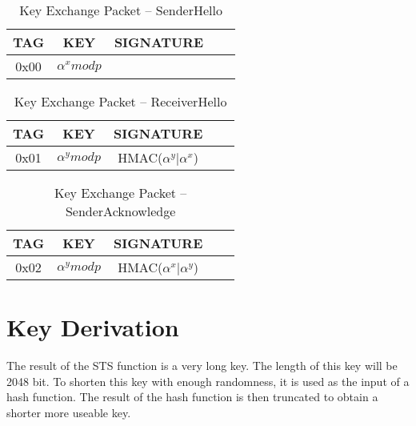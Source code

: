 \documentclass[a4paper]{article}
\begin{document}
\begin{table}[H]
    \begin{center}
        \begin{tabular}{| c | c | c | c | c |}
            \hline
            TAG & KEY & SIGNATURE \\ \hline
            0x00 & $\alpha^x mod p$ & \\
            \hline
        \end{tabular}
    \end{center}
    
    \caption{Key Exchange Packet -- SenderHello}
    \label{tab:key_exchange_packet_senderhello}
\end{table}
\begin{table}[H]
    \begin{center}
        \begin{tabular}{| c | c | c | c | c |}
            \hline
            TAG & KEY & SIGNATURE \\ \hline
            0x01 & $\alpha^y mod p$ & HMAC($\alpha^y \big| \alpha^x$)\\
            \hline
        \end{tabular}
    \end{center}
    
    \caption{Key Exchange Packet -- ReceiverHello}
    \label{tab:key_exchange_packet_receiverhello}
\end{table}
\begin{table}[H]
    \begin{center}
        \begin{tabular}{| c | c | c | c | c |}
            \hline
            TAG & KEY & SIGNATURE \\ \hline
            0x02 & $\alpha^y mod p$ & HMAC($\alpha^x \big| \alpha^y$)\\
            \hline
        \end{tabular}
    \end{center}
    
    \caption{Key Exchange Packet -- SenderAcknowledge}
    \label{tab:key_exchange_packet_senderacknowledge}
\end{table}

\section{Key Derivation}

The result of the STS function is a very long key. The length of this key will be 2048 bit. To shorten this key with enough randomness, it is used as the input of a hash function. The result of the hash function is then truncated to obtain a shorter more useable key.\\
\end{document}

